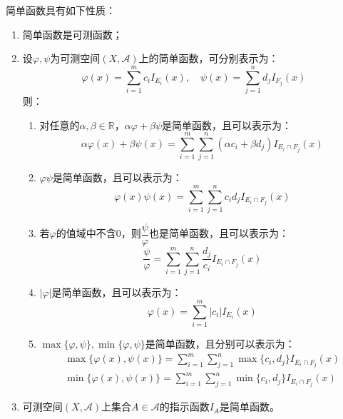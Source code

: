 \begin{property}\label{prop:SimpleFunction}
	简单函数具有如下性质：
	\begin{enumerate}
		\item 简单函数是可测函数；
		\item 设$\varphi,\psi$为可测空间$(X,\mathscr{A})$上的简单函数，可分别表示为：
		\begin{equation*}
			\varphi(x)=\sum_{i=1}^{m}c_iI_{E_i}(x),\quad
			\psi(x)=\sum_{j=1}^{n}d_jI_{F_j}(x)
		\end{equation*}
		则：
		\begin{enumerate}
			\item 对任意的$\alpha,\beta\in\mathbb{R}$，$\alpha\varphi+\beta\psi$是简单函数，且可以表示为：
			\begin{equation*}
				\alpha\varphi(x)+\beta\psi(x)=\sum_{i=1}^{m}\sum_{j=1}^{n}(\alpha c_i+\beta d_j)I_{E_i\cap F_j}(x)
			\end{equation*}
			\item $\varphi\psi$是简单函数，且可以表示为：
			\begin{equation*}
					\varphi(x)\psi(x)=\sum_{i=1}^{m}\sum_{j=1}^{n}c_id_jI_{E_i\cap F_j}(x)
			\end{equation*}
			\item 若$\varphi$的值域中不含$0$，则$\dfrac{\psi}{\varphi}$也是简单函数，且可以表示为：
			\begin{equation*}
				\frac{\psi}{\varphi}=\sum_{i=1}^{m}\sum_{j=1}^{n}\frac{d_j}{c_i}I_{E_i\cap F_j}(x)
			\end{equation*}
			\item $|\varphi|$是简单函数，且可以表示为：
			\begin{equation*}
				\varphi(x)=\sum_{i=1}^{m}|c_i|I_{E_i}(x)
			\end{equation*}
			\item $\max\{\varphi,\psi\},\min\{\varphi,\psi\}$是简单函数，且分别可以表示为：
			\begin{gather*}
				\max\{\varphi(x),\psi(x)\}=\sum_{i=1}^{m}\sum_{j=1}^{n}\max\{c_i,d_j\}I_{E_i\cap F_j}(x) \\
				\min\{\varphi(x),\psi(x)\}=\sum_{i=1}^{m}\sum_{j=1}^{n}\min\{c_i,d_j\}I_{E_i\cap F_j}(x)
			\end{gather*}
		\end{enumerate}
		\item 可测空间$(X,\mathscr{A})$上集合$A\in\mathscr{A}$的指示函数$I_A$是简单函数。
	\end{enumerate}
\end{property}
